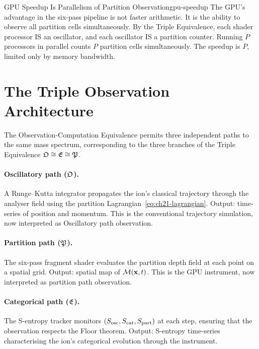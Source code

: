 \begin{consequence}{GPU Speedup Is Parallelism of Partition Observation}{gpu-speedup}
  The GPU's advantage in the six-pass pipeline is not faster arithmetic.
  It is the ability to observe all partition cells simultaneously.  By the
  Triple Equivalence, each shader processor IS an oscillator, and each
  oscillator IS a partition counter.  Running $P$ processors in parallel
  counts $P$ partition cells simultaneously.  The speedup is $P$, limited
  only by memory bandwidth.
\end{consequence}

\section{The Triple Observation Architecture}
\label{sec:ch22-triple-obs}

The Observation-Computation Equivalence permits three independent paths to
the same mass spectrum, corresponding to the three branches of the Triple
Equivalence $\mathfrak{O}\cong\mathfrak{E}\cong\mathfrak{P}$.

\paragraph{Oscillatory path ($\mathfrak{O}$).}
A Runge--Kutta integrator propagates the ion's classical trajectory through
the analyser field using the partition Lagrangian~\eqref{eq:ch21-lagrangian}.
Output: time-series of position and momentum.  This is the conventional
trajectory simulation, now interpreted as Oscillatory path observation.

\paragraph{Partition path ($\mathfrak{P}$).}
The six-pass fragment shader evaluates the partition depth field at each point
on a spatial grid.  Output: spatial map of $\mathcal{M}(\mathbf{x},t)$.  This is
the GPU instrument, now interpreted as partition path observation.

\paragraph{Categorical path ($\mathfrak{E}$).}
The S-entropy tracker monitors $(S_{\mathrm{osc}}, S_{\mathrm{cat}}, S_{\mathrm{part}})$ at each step, ensuring that
the observation respects the Floor theorem.  Output: S-entropy time-series
characterising the ion's categorical evolution through the instrument.

